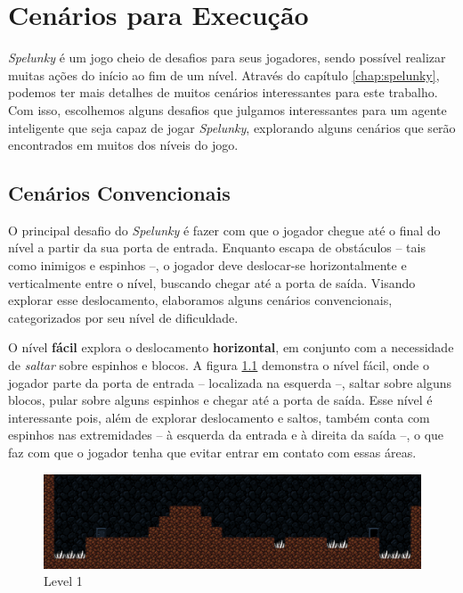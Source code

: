 \chapter{\label{chap:scenarios}Cenários para Execução}


\textit{Spelunky} é um jogo cheio de desafios para seus jogadores, sendo
possível realizar muitas ações do início ao fim de um nível. Através do
capítulo \ref{chap:spelunky}, podemos ter mais detalhes de muitos cenários
interessantes para este trabalho. Com isso, escolhemos alguns desafios que
julgamos interessantes para um agente inteligente que seja capaz de jogar
\textit{Spelunky}, explorando alguns cenários que serão encontrados em muitos
dos níveis do jogo.

\section{Cenários Convencionais}

O principal desafio do \textit{Spelunky} é fazer com que o jogador chegue até
o final do nível a partir da sua porta de entrada. Enquanto escapa de
obstáculos -- tais como inimigos e espinhos --, o jogador deve deslocar-se
horizontalmente e verticalmente entre o nível, buscando chegar até a porta de
saída. Visando explorar esse deslocamento, elaboramos alguns cenários
convencionais, categorizados por seu nível de dificuldade.

O nível \textbf{fácil} explora o deslocamento \textbf{horizontal}, em conjunto
com a necessidade de \textit{saltar} sobre espinhos e blocos. A figura
\ref{fig:level1} demonstra o nível fácil, onde o jogador parte da porta de
entrada -- localizada na esquerda --, saltar sobre alguns blocos, pular sobre
alguns espinhos e chegar até a porta de saída. Esse nível é interessante pois,
além de explorar deslocamento e saltos, também conta com espinhos nas
extremidades -- à esquerda da entrada e à direita da saída --, o que faz com
que o jogador tenha que evitar entrar em contato com essas áreas.

\begin{figure}[H]
\centering
\includegraphics[width=\textwidth]{fig/levels/level1.pdf}
\caption{Level 1}
\label{fig:level1}
\end{figure}

